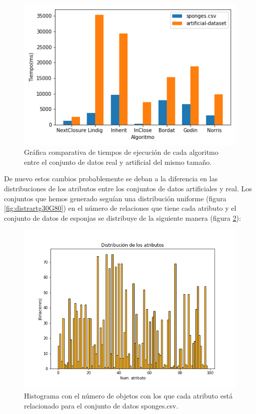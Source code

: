 \documentclass[oneside,openright,titlepage,numbers=noenddot,openany,headinclude,footinclude=true,
cleardoublepage=empty,abstractoff,BCOR=5mm,paper=a4,fontsize=12pt,main=spanish]{scrreprt}
\begin{document}
\begin{itemize}
\begin{figure}[H]
  \centering
  \includegraphics[scale=0.6]{images/comparative-sponges.png}
  
\caption{Gráfica comparativa de tiempos de ejecución de cada algoritmo entre el conjunto de datos real y artificial del mismo tamaño. }
\label{fig:compsponges}
\end{figure}
\end{itemize}

De nuevo estos cambios probablemente se deban a la diferencia en las distribuciones de los atributos entre los conjuntos de datos artificiales y real. Los conjuntos que hemos generado seguían una distribución uniforme (figura \ref{fig:distrartg30G80}) en el número de relaciones que tiene cada atributo y el conjunto de datos de esponjas se distribuye de la siguiente manera (figura \ref{fig:dissponges}):

\begin{figure}[H]
  \centering
  \includegraphics[scale=0.4]{images/distribution-sponges.png}
\caption{Histograma con el número de objetos con los que cada atributo está relacionado para el conjunto de datos sponges.csv. }
  \label{fig:dissponges}

\end{figure}
\end{document}
